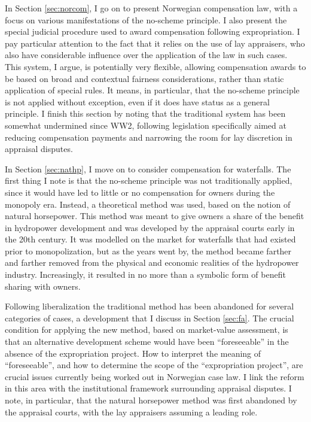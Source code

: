 In Section \ref{sec:norcom}, I go on to present Norwegian compensation law, with a focus on various manifestations of the no-scheme principle. I also present the special judicial procedure used to award compensation following expropriation. I pay particular attention to the fact that it relies on the use of lay appraisers, who also have considerable influence over the application of the law in such cases. This system, I argue, is potentially very flexible, allowing compensation awards to be based on broad and contextual fairness considerations, rather than static application of special rules. It means, in particular, that the no-scheme principle is not applied without exception, even if it does have status as a general principle. I finish this section by noting that the traditional system has been somewhat undermined since WW2, following legislation specifically aimed at reducing compensation payments and narrowing the room for lay discretion in appraisal disputes.

In Section \ref{sec:nathp}, I move on to consider compensation for waterfalls. The first thing I note is that the no-scheme principle was not traditionally applied, since it would have led to little or no compensation for owners during the monopoly era. Instead, a theoretical method was used, based on the notion of natural horsepower. This method was meant to give owners a share of the benefit in hydropower development and was developed by the appraisal courts early in the 20th century. It was modelled on the market for waterfalls that had existed prior to monopolization, but as the years went by, the method became farther and farther removed from the physical and economic realities of the hydropower industry. Increasingly, it resulted in no more than a symbolic form of benefit sharing with owners.

Following liberalization the traditional method has been abandoned for several categories of cases, a development that I discuss in Section \ref{sec:fa}. The crucial condition for applying the new method, based on market-value assessment, is that an alternative development scheme would have been ``foreseeable'' in the absence of the expropriation project. How to interpret the meaning of ``foreseeable'', and how to determine the scope of the ``expropriation project'', are crucial issues currently being worked out in Norwegian case law. I link the reform in this area with the institutional framework surrounding appraisal disputes. I note, in particular, that the natural horsepower method was first abandoned by the appraisal courts, with the lay appraisers assuming a leading role. 

